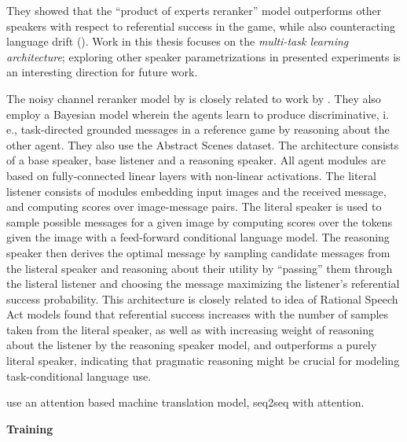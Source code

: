They showed that the ``product of experts reranker'' model outperforms other speakers with respect to referential success in the game, while also counteracting language drift (). 
Work in this thesis focuses on the \textit{multi-task learning architecture}; exploring other speaker parametrizations in presented experiments is an interesting direction for future work.

The noisy channel reranker model by \cite{lazaridou2020multi} is closely related to work by \parencite{andreas2016reasoning}. They also employ a Bayesian model wherein the agents learn to produce discriminative, i. e., task-directed grounded messages in a reference game by reasoning about the other agent. They also use the Abstract Scenes dataset. The architecture consists of a base speaker, base listener and a reasoning speaker. All agent modules are based on fully-connected linear layers with non-linear activations. The literal listener consists of modules embedding input images and the received message, and computing scores over image-message pairs. The literal speaker is used to sample possible messages for a given image by computing scores over the tokens given the image with a feed-forward conditional language model. The reasoning speaker then derives the optimal message by sampling candidate messages from the listeral speaker and reasoning about their utility by ``passing'' them through the listeral listener and choosing the message maximizing the listener's referential success probability. This architecture is closely related to idea of Rational Speech Act models 
\cite{andreas2016reasoning} found that referential success increases with the number of samples taken from the literal speaker, as well as with increasing weight of reasoning about the listener by the reasoning speaker model, and outperforms a purely literal speaker, indicating that pragmatic reasoning might be crucial for modeling task-conditional language use. 

\cite{lee2019countering} use an attention based machine translation model, seq2seq with attention. 



\textbf{Training}


